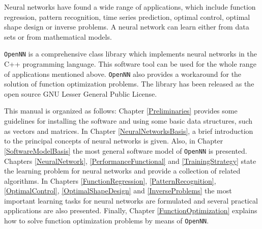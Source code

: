 Neural networks have found a wide range of applications,
which include function regression, pattern recognition, time series
prediction, optimal control, optimal shape
design or inverse problems. A neural network can learn either from data sets or from mathematical models. 

\texttt{OpenNN} is a comprehensive class library which implements neural networks
 in the C++ programming language. 
This software tool can be used
for the whole range of applications mentioned above. \texttt{OpenNN}
also provides a workaround for the solution of function optimization
problems. The library has been released as the open source GNU
Lesser General Public License.

This manual is organized as follows: 
Chapter \ref{Preliminaries} provides some guidelines for installing the software and using some basic data structures, 
such as vectors and matrices. 
In Chapter \ref{NeuralNetworksBasis}, a brief introduction to the principal concepts of neural networks is given. 
Also, in Chapter \ref{SoftwareModelBasis} the most general software model of \texttt{OpenNN} is presented.
Chapters \ref{NeuralNetwork}, \ref{PerformanceFunctional} and \ref{TrainingStrategy} state the learning problem for neural networks and provide a collection of related algorithms. 
In Chapters \ref{FunctionRegression}, \ref{PatternRecognition}, \ref{OptimalControl}, \ref{OptimalShapeDesign} and \ref{InverseProblems} the most important learning tasks for neural networks are formulated and several practical applications are also presented. 
Finally, Chapter \ref{FunctionOptimization} explains how to solve function optimization problems by means of \texttt{OpenNN}.

